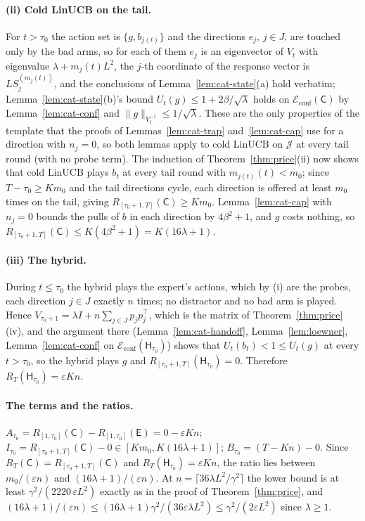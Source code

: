 \documentclass[anon]{alt2027} %
\providecommand{\qed}{\hfill\jmlrBlackBox}
\newcommand{\eps}{\varepsilon}
\newcommand{\Cold}{\mathsf{C}}
\newcommand{\Exp}{\mathsf{E}}
\newcommand{\Hyb}{\mathsf{H}}
\begin{document}
\paragraph{(ii) Cold LinUCB on the tail.}
For $t>\tau_0$ the action set is $\{g,b_{j(t)}\}$ and the directions $e_j$,
$j\in J$, are touched only by the bad arms, so for each of them $e_j$ is an
eigenvector of $V_t$ with eigenvalue $\lambda+m_j(t)L^2$, the $j$-th
coordinate of the response vector is $LS_j^{(m_j(t))}$, and the conclusions of
Lemma~\ref{lem:cat-state}(a) hold verbatim; Lemma~\ref{lem:cat-state}(b)'s
bound $U_t(g)\le1+2\beta/\sqrt\lambda$ holds on $\mathcal E_{\mathrm{conf}}(\Cold)$
by Lemma~\ref{lem:cat-conf} and $\|g\|_{V_t^{-1}}\le1/\sqrt\lambda$. These are
the only properties of the template that the proofs of
Lemmas~\ref{lem:cat-trap} and~\ref{lem:cat-cap} use for a direction with
$n_j=0$, so both lemmas apply to cold LinUCB on $\mathcal J$ at every tail
round (with no probe term). The induction of Theorem~\ref{thm:price}(ii) now
shows that cold LinUCB plays $b_t$ at every tail round with $m_{j(t)}(t)<m_0$;
since $T-\tau_0\ge Km_0$ and the tail directions cycle, each direction is
offered at least $m_0$ times on the tail, giving $R_{[\tau_0+1,T]}(\Cold)\ge Km_0$.
Lemma~\ref{lem:cat-cap} with $n_j=0$ bounds the pulls of $b$ in each
direction by $4\beta^2+1$, and $g$ costs nothing, so
$R_{[\tau_0+1,T]}(\Cold)\le K(4\beta^2+1)=K(16\lambda+1)$.

\paragraph{(iii) The hybrid.}
During $t\le\tau_0$ the hybrid plays the expert's actions, which by (i) are
the probes, each direction $j\in J$ exactly $n$ times; no distractor and no
bad arm is played. Hence $V_{\tau_0+1}=\lambda I+n\sum_{j\in J}p_jp_j^\top$,
which is the matrix of Theorem~\ref{thm:price}(iv), and the argument there
(Lemma~\ref{lem:cat-handoff}, Lemma~\ref{lem:loewner}, Lemma~\ref{lem:cat-conf}
on $\mathcal E_{\mathrm{conf}}(\Hyb_{\tau_0})$) shows that
$U_t(b_t)<1\le U_t(g)$ at every $t>\tau_0$, so the hybrid plays $g$ and
$R_{[\tau_0+1,T]}(\Hyb_{\tau_0})=0$. Therefore $R_T(\Hyb_{\tau_0})=\eps Kn$.

\paragraph{The terms and the ratios.}
$A_{\tau_0}=R_{[1,\tau_0]}(\Cold)-R_{[1,\tau_0]}(\Exp)=0-\eps Kn$;
$I_{\tau_0}=R_{[\tau_0+1,T]}(\Cold)-0\in[Km_0,K(16\lambda+1)]$;
$B_{\tau_0}=(T-Kn)-0$. Since $R_T(\Cold)=R_{[\tau_0+1,T]}(\Cold)$ and
$R_T(\Hyb_{\tau_0})=\eps Kn$, the ratio lies between $m_0/(\eps n)$ and
$(16\lambda+1)/(\eps n)$. At $n=\lceil36\lambda L^2/\gamma^2\rceil$ the lower bound
is at least $\gamma^2/(2220\,\eps L^2)$ exactly as in the proof of
Theorem~\ref{thm:price}, and $(16\lambda+1)/(\eps n)\le(16\lambda+1)\gamma^2/(36\eps\lambda L^2)\le \gamma^2/(2\eps L^2)$
since $\lambda\ge1$. \qed
\end{document}
